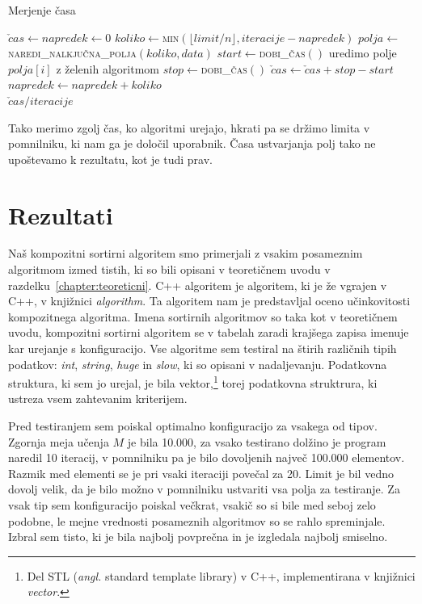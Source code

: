 \documentclass[a4paper,oneside,12pt]{article}
\begin{document}
\begin{algorithm}[h!t!]
  \caption{Merjenje časa}\label{algo:time}
  \begin{algorithmic}[1]
    \State \label{line:init} $\check{c}as \gets napredek \gets 0$
    \Repeat \label{line:repeattimestart}
      \State \label{line:koliko} $koliko \gets $\textsc{min}$(\lfloor limit / n \rfloor, iteracije - napredek)$
      \State \label{line:polja} $polja \gets $\textsc{naredi\_nalkjučna\_polja}$(koliko, data)$
      \State \label{line:getstarttime} $start \gets $\textsc{dobi\_čas}$()$
       \label{line:beginsortfor}
        \State uredimo polje $polja[i]$ z želenih algoritmom
      \EndFor \label{line:endsortfor}
      \State \label{line:getendtime} $stop \gets $\textsc{dobi\_čas}$()$
      \State $\check{c}as \gets \check{c}as + stop - start$
      \State $napredek \gets napredek + koliko$
     \label{line:repeattimeend} \\
    \Return \label{line:returnaverage}$\check{c}as / iteracije$
  \end{algorithmic}
\end{algorithm}
Tako merimo zgolj čas, ko algoritmi urejajo, hkrati pa se držimo limita v pomnilniku, ki
nam ga je določil uporabnik. Časa ustvarjanja polj tako ne upoštevamo k rezultatu, kot
je tudi prav.
\pagebreak


\section{Rezultati}
Naš kompozitni sortirni algoritem smo primerjali z vsakim posameznim algoritmom izmed
tistih, ki so bili opisani v teoretičnem uvodu v razdelku~\ref{chapter:teoreticni}. C++ algoritem
je algoritem, ki je že vgrajen v C++, v knjižnici \emph{algorithm}. Ta algoritem
nam je predstavljal oceno učinkovitosti kompozitnega algoritma.
Imena sortirnih algoritmov so taka kot v teoretičnem uvodu, kompozitni sortirni algoritem se v tabelah 
zaradi krajšega zapisa imenuje kar urejanje s konfiguracijo.
Vse algoritme sem testiral na štirih različnih tipih podatkov: 
\emph{int}, \emph{string}, \emph{huge} in \emph{slow}, ki so opisani v nadaljevanju.
Podatkovna struktura, ki sem jo urejal, je bila vektor,\footnote{Del STL
(\emph{angl.} standard template library) v C++,
implementirana v knjižnici \emph{vector}.} torej podatkovna struktrura, ki
ustreza vsem zahtevanim kriterijem.

Pred testiranjem sem poiskal optimalno konfiguracijo za vsakega od tipov. Zgornja meja
učenja $M$ je bila 10.000, za vsako testirano dolžino je program naredil 10 iteracij, v pomnilniku
pa je bilo dovoljenih največ 100.000 elementov. Razmik med elementi se je pri vsaki iteraciji povečal za 20.
Limit je bil vedno dovolj velik, da je bilo možno v pomnilniku ustvariti vsa
polja za testiranje. Za vsak tip sem konfiguracijo poiskal večkrat, vsakič so si
bile med seboj zelo podobne, le mejne vrednosti posameznih algoritmov so se
rahlo spreminjale. Izbral sem tisto, ki je bila najbolj povprečna in je
izgledala najbolj smiselno.
\end{document}
